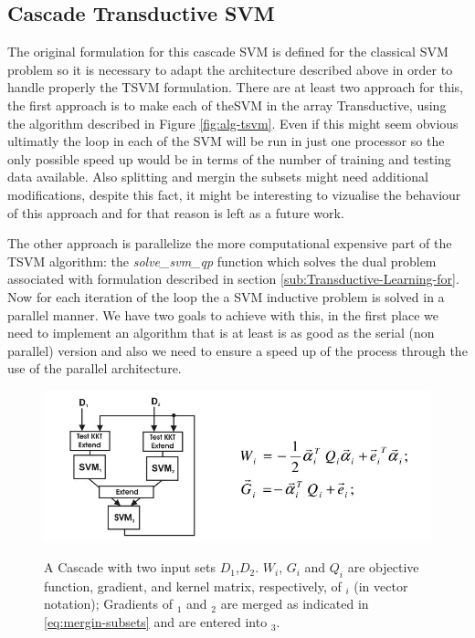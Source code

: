 \subsection{Cascade Transductive SVM}

The original formulation for this cascade SVM is defined for the classical
SVM problem so it is necessary to adapt the architecture described
above in order to handle properly the TSVM formulation. There are
at least two approach for this, the first approach is to make each
of theSVM in the array Transductive, using the algorithm described
in Figure \ref{fig:alg-tsvm}. Even if this might seem obvious ultimatly
the loop in each of the SVM will be run in just one processor so the
only possible speed up would be in terms of the number of training
and testing data available. Also splitting and mergin the subsets
might need additional modifications, despite this fact, it might be
interesting to vizualise the behaviour of this approach and for that
reason is left as a future work.

The other approach is parallelize the more computational expensive
part of the TSVM algorithm: the \emph{solve\_svm\_qp} function which
solves the dual problem associated with formulation described in section
\ref{sub:Transductive-Learning-for}. Now for each iteration of the
loop the a SVM inductive problem is solved in a parallel manner. We
have two goals to achieve with this, in the first place we need to
implement an algorithm that is at least is as good as the serial (non
parallel) version and also we need to ensure a speed up of the process
through the use of the parallel architecture.


%
\begin{figure}
\begin{centering}
\includegraphics[scale=0.5]{images/graf-svm-cascade-of-3}\label{fig:graf-3-svm}
\par\end{centering}

\begin{centering}
\caption{A Cascade with two input sets $D_{1}$,$D_{2}$. $W_{i}$, $G_{i}$
and $Q_{i}$ are objective function, gradient, and kernel matrix,
respectively, of $_{i}$ (in vector notation); Gradients
of $_{1}$ and $_{2}$ are merged as indicated
in \ref{eq:mergin-subsets} and are entered into $_{3}$.
\cite{GrafCBDV04}}

\par\end{centering}
\end{figure}


